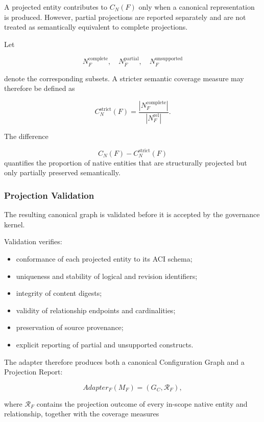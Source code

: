 \documentclass[10pt]{article}
\begin{document}
A projected entity contributes to $C_N(F)$ only when a canonical representation
is produced. However, partial projections are reported separately and are not
treated as semantically equivalent to complete projections.

Let

\begin{equation}
N_F^{\mathrm{complete}},
\quad
N_F^{\mathrm{partial}},
\quad
N_F^{\mathrm{unsupported}}
\label{eq:proj_entity_state_repr}
\end{equation}

denote the corresponding subsets. A stricter semantic coverage measure may
therefore be defined as

\[
C_N^{\mathrm{strict}}(F)
=
\frac{
	|N_F^{\mathrm{complete}}|
}{
	|N_F^{\mathrm{rel}}|
}.
\]

The difference

\[
C_N(F)-C_N^{\mathrm{strict}}(F)
\]
quantifies the proportion of native entities that are structurally projected
but only partially preserved semantically.

\subsubsection{Projection Validation}

The resulting canonical graph is validated before it is accepted by the
governance kernel.

Validation verifies:

\begin{itemize}
	\item conformance of each projected entity to its ACI schema;
	\item uniqueness and stability of logical and revision identifiers;
	\item integrity of content digests;
	\item validity of relationship endpoints and cardinalities;
	\item preservation of source provenance;
	\item explicit reporting of partial and unsupported constructs.
\end{itemize}

The adapter therefore produces both a canonical Configuration Graph and a
Projection Report:

\[
	Adapter_F(M_F)
	=
	(G_C,\mathcal{R}_F),
\]

where $\mathcal{R}_F$ contains the projection outcome of every in-scope native
entity and relationship, together with the coverage measures
\end{document}

